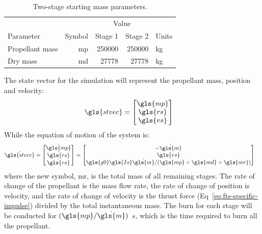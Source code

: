 \documentclass[12pt,openany]{book}
\begin{document}
\begin{table}
  \centering
  \begin{tabular}[htbp]{ l r r r l }
    \toprule
                    &          & \multicolumn{2}{c}{Value}    &           \\ \cmidrule{3-4}
    Parameter       & Symbol   & Stage 1      & Stage 2       & Units     \\ \midrule
    Propellant mass & \gls{mp} & \num{250000} & \num{250000}  & \si{kg}   \\
    Dry mass        & \gls{md} & \num{27778}  & \num{27778}   & \si{kg}   \\
    \bottomrule
  \end{tabular}
  \caption{Two-stage starting mass parameters.}
  \label{tab:two-stage}
\end{table}

The state vector for the simulation will represent the propellant mass, position and velocity:
\begin{align}
  \gls{stvec} &=
  \begin{bmatrix}
    \gls{mp} \\
    \gls{rs} \\
    \gls{vs}
  \end{bmatrix}
\end{align}
While the equation of motion of the system is:
\begin{align}
  \dot{\gls{stvec}} &=
  \begin{bmatrix}
    \dot{\gls{mp}} \\
    \dot{\gls{rs}} \\
    \dot{\gls{vs}}
  \end{bmatrix} =
  \begin{bmatrix}
    -\dot{\gls{m}} \\
    \gls{vs} \\
    \gls{g0}\gls{Is}\dot{\gls{m}} / (\gls{mp} + \gls{md} + \gls{mr})
  \end{bmatrix}
\end{align}
where the new symbol, \gls{mr}, is the total mass of all remaining stages. The rate of change of the propellant is the mass flow rate, the rate of change of position is velocity, and the rate of change of velocity is the thrust force (Eq~\ref{eq:fts-specific-impulse}) divided by the total instantaneous mass. The burn for each stage will be conducted for \((\gls{mp}/\dot{\gls{m}})\)~\si{s}, which is the time required to burn all the propellant.
\end{document}

